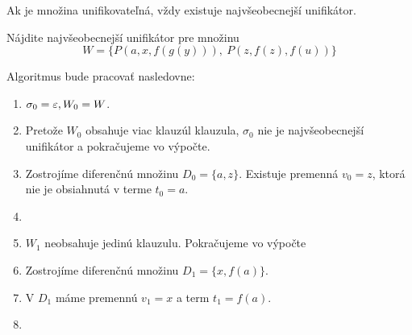 \begin{poznamka}
    Ak je množina unifikovateľná, vždy existuje najvšeobecnejší unifikátor.
\end{poznamka}

\begin{priklad}
    Nájdite najvšeobecnejší unifikátor pre množinu
    \begin{equation*}
        W=\{ P(a,x,f(g(y))),\ P(z,f(z),f(u)) \}
    \end{equation*}

    Algoritmus bude pracovať nasledovne:
    \begin{enumerate}
        \item $\sigma_0 = \varepsilon, W_0 = W$.

        \item Pretože $W_0$ obsahuje viac klauzúl klauzula,
            $\sigma_0$ nie je najvšeobecnejší unifikátor a pokračujeme
            vo výpočte.

        \item Zostrojíme diferenčnú množinu $D_0 = \{a, z\}$.
            Existuje premenná $v_0 = z$, 
            ktorá nie je obsiahnutá v terme $t_0 = a$.

        \item {}

        \item $W_1$ neobsahuje jedinú klauzulu. Pokračujeme vo výpočte

        \item Zostrojíme diferenčnú množinu $D_1 = \{x, f(a)\}$.

        \item V $D_1$ máme premennú $v_1 = x$ a term $t_1 = f(a)$.

        \item {}


\end{enumerate}
\end{priklad}
